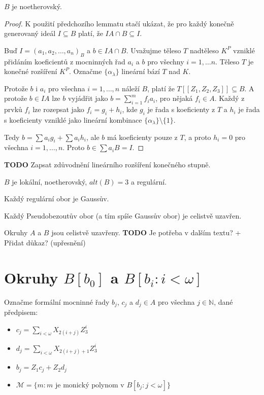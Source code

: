 \documentclass[11pt,a4paper]{article}
\newcommand\m[1]{\mathbb { #1 }} %
\newcommand\p[1]{\mathcal{ #1 }} %
\newcommand\N{\m N}
\theoremstyle{definition}
\theoremstyle{plain}
\begin{document}
\veta $B$ je noetherovský.
\begin{proof}
	K použití předchozího lemmatu stačí ukázat, že pro každý konečně generovaný
	ideál $I \subseteq B$ platí, že $IA \cap B \subseteq I$.

	Buď $I = (a_1, a_2, \dots, a_n)_B$ a $b \in IA \cap B$. Uvažujme těleso $T$
	nadtěleso $K^P$ vzniklé přidáním koeficientů z mocninných řad $a_i$ a $b$
	pro všechny $i = 1, \dots n$. Těleso $T$ je konečné rozšíření $K^P$.
	Označme $\{\alpha_\lambda\}$ lineární bází $T$ nad $K$.

	Protože $b$ i $a_i$ pro všechna $i=1,\dots,n$ náleží $B$, platí že
	$T[[Z_1,Z_2,Z_3]] \subseteq B$. A protože $b \in IA$ lze $b$ vyjádřit jako
	$b = \sum_{i = 1}^m f_i a_i$, pro nějaká $f_i \in A$. Každý z prvků $f_i$
	lze rozepsat jako $f_i = g_i + h_i$, kde $g_i$ je řada s koeficienty z $T$
	a $h_i$ je řada s koeficienty vzniklé jako lineární kombinace
	$\{\alpha_\lambda\} \setminus \{1\}$.

	Tedy $b = \sum a_ig_i + \sum a_ih_i$, ale $b$ má koeficienty pouze z $T$, a
	proto $h_i = 0$ pro všechna $i = 1,\dots,n$. Proto $b \in \sum a_iB = I$.
\end{proof}
\textbf{TODO} Zapsat zdůvodnění lineárního rozšíření konečného stupně.

\veta $B$ je lokální, noetherovský, $alt(B) = 3$ a regulární.

\tvrzeni[Fakt] Každý regulární obor je Gaussův.

\tvrzeni[Fakt] Každý Pseudobezoutův obor (a tím spíše Gaussův obor) je celistvě uzavřen.

\dusledek Okruhy $A$ a $B$ jsou celistvě uzavřeny.
\textbf{TODO} Je potřeba v dalším textu? + Přidat důkaz? (upřesnění)

\section{Okruhy $B[b_0]$ a $B[b_i : i < \omega]$}
 Označme formální mocninné řady $b_j$, $c_j$ a $d_j \in A$ pro všechna
$j \in \N$, dané předpisem:
\begin{itemize}
	\item $c_j = \sum_{i < \omega} X_{2(i + j)} Z^i_3$
	\item $d_j = \sum_{i < \omega} X_{2(i + j) + 1} Z^i_3$
	\item $b_j = Z_1c_j + Z_2d_j$
	\item $\p M = \{ m : m \text{ je monický polynom v } B[b_j : j < \omega] \}$
\end{itemize}
\end{document}
